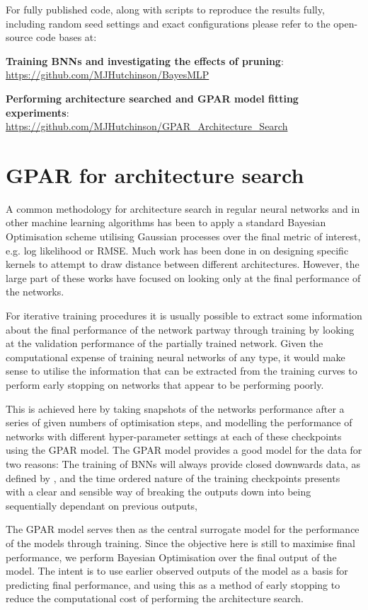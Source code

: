 For fully published code, along with scripts to reproduce the results fully, including random seed settings and exact configurations please refer to the open-source code bases at:

\noindent\textbf{Training BNNs and investigating the effects of pruning}:\\\url{https://github.com/MJHutchinson/BayesMLP}

\noindent\textbf{Performing architecture searched and GPAR model fitting experiments}:\\\url{https://github.com/MJHutchinson/GPAR_Architecture_Search}


\section{GPAR for architecture search}

A common methodology for architecture search in regular neural networks and in other machine learning algorithms has been to apply a standard Bayesian Optimisation scheme utilising Gaussian processes over the final metric of interest, e.g. log likelihood or RMSE. Much work has been done in on designing specific kernels to attempt to draw distance between different architectures. However, the large part of these works have focused on looking only at the final performance of the networks. 

For iterative training procedures it is usually possible to extract some information about the final performance of the network partway through training by looking at the validation performance of the partially trained network. Given the computational expense of training neural networks of any type, it would make sense to utilise the information that can be extracted from the training curves to perform early stopping on networks that appear to be performing poorly. 

This is achieved here by taking snapshots of the networks performance after a series of  given numbers of optimisation steps, and modelling the performance of networks with different hyper-parameter settings at each of these checkpoints using the GPAR model. The GPAR model provides a good model for the data for two reasons: The training of BNNs will always provide closed downwards data, as defined by \citet{Requeima2018}, and the time ordered nature of the training checkpoints presents with a clear and sensible way of breaking the outputs down into being sequentially dependant on previous outputs, 

The GPAR model serves then as the central surrogate model for the performance of the models through training. Since the objective here is still to maximise final performance, we perform Bayesian Optimisation over the final output of the model. The intent is to use earlier observed outputs of the model as a basis for predicting final performance, and using this as a method of early stopping to reduce the computational cost of performing the architecture search. 

